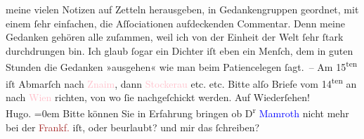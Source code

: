                     meine vielen Notizen auf Zetteln herausgeben, in Gedankengruppen geordnet, mit
                    einem ſehr einfachen, die Aſſociationen aufdeckenden Commentar. Denn meine
                    Gedanken gehören alle zuſammen, weil ich von der Einheit der Welt ſehr ſtark
                    durchdrungen bin. Ich glaub ſogar ein Dichter iſt eben ein Menſch, dem in guten
                    Stunden die Gedanken »ausgehen« wie man beim Patiencelegen ſagt. – Am
                            15\textsuperscript{ten} iſt Abmarſch {\pb}nach
                        \textcolor{pink}{Znaim}{}\ledrightnote{\textcolor{pink}{Znaim}}, dann \textcolor{pink}{Stockerau}{}\ledrightnote{\textcolor{pink}{Stockerau}} etc. etc. Bitte alſo Briefe vom 14\textsuperscript{ten} an nach \textcolor{pink}{Wien}{}\ledrightnote{\textcolor{pink}{Wien}} richten, von wo ſie
                    nachgeſchickt werden.\pend
           \pstart
           Auf Wiederſehen!{\\[\baselineskip]}\spacefill\mbox{Hugo.}\pend
           \leftskip=0em{}\pstart
           \noindent{}Bitte können Sie in Erfahrung bringen ob D\textsuperscript{r}{ }\textcolor{blue}{Mamroth}{}\ledrightnote{\textcolor{blue}{Fedor Mamroth}} nicht mehr bei der \textcolor{brown}{Frankf.}{}\ledrightnote{\textcolor{brown}{Frankfurter Zeitung}} iſt, oder beurlaubt? und mir das
                        ſchreiben? \pend
           \endnumbering{}  
      